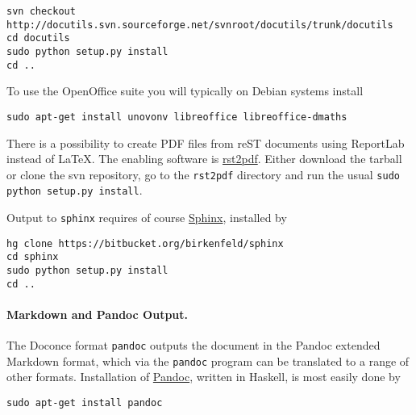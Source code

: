 \documentclass[%
oneside,                 %
final,                   %
10pt]{article}
\begin{document}
\vspace{4pt}
\begin{Verbatim}[numbers=none,frame=lines,label=\fbox{{\tiny Terminal}},fontsize=\fontsize{9pt}{9pt},
labelposition=topline,framesep=2.5mm,framerule=0.7pt]
svn checkout http://docutils.svn.sourceforge.net/svnroot/docutils/trunk/docutils
cd docutils
sudo python setup.py install
cd ..
\end{Verbatim}
To use the OpenOffice suite you will typically on Debian systems install
\vspace{4pt}
\begin{Verbatim}[numbers=none,frame=lines,label=\fbox{{\tiny Terminal}},fontsize=\fontsize{9pt}{9pt},
labelposition=topline,framesep=2.5mm,framerule=0.7pt]
sudo apt-get install unovonv libreoffice libreoffice-dmaths
\end{Verbatim}

There is a possibility to create PDF files from reST documents
using ReportLab instead of {\LaTeX}. The enabling software is
\href{{http://code.google.com/p/rst2pdf}}{rst2pdf}. Either download the tarball
or clone the svn repository, go to the {\fontsize{10pt}{10pt}\Verb!rst2pdf!} directory and
run the usual {\fontsize{10pt}{10pt}\Verb!sudo python setup.py install!}.


Output to {\fontsize{10pt}{10pt}\Verb!sphinx!} requires of course \href{{http://sphinx.pocoo.org}}{Sphinx},
installed by
\vspace{4pt}
\begin{Verbatim}[numbers=none,frame=lines,label=\fbox{{\tiny Terminal}},fontsize=\fontsize{9pt}{9pt},
labelposition=topline,framesep=2.5mm,framerule=0.7pt]
hg clone https://bitbucket.org/birkenfeld/sphinx
cd sphinx
sudo python setup.py install
cd ..
\end{Verbatim}

\paragraph{Markdown and Pandoc Output.}
The Doconce format {\fontsize{10pt}{10pt}\Verb!pandoc!} outputs the document in the Pandoc
extended Markdown format, which via the {\fontsize{10pt}{10pt}\Verb!pandoc!} program can be
translated to a range of other formats. Installation of \href{{http://johnmacfarlane.net/pandoc/}}{Pandoc}, written in Haskell, is most
easily done by

\vspace{4pt}
\begin{Verbatim}[numbers=none,frame=lines,label=\fbox{{\tiny Terminal}},fontsize=\fontsize{9pt}{9pt},
labelposition=topline,framesep=2.5mm,framerule=0.7pt]
sudo apt-get install pandoc
\end{Verbatim}
\end{document}
